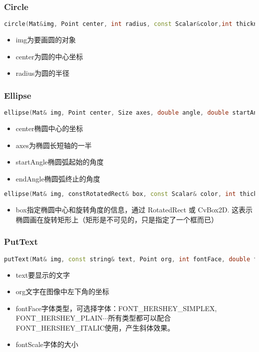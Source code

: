 \documentclass[12pt]{article}
\begin{document}
\subsubsection{Circle}
\begin{lstlisting}[language=c++]
circle(Mat&img, Point center, int radius, const Scalar&color,int thickness=1, int lineType=8, int shift=0)
\end{lstlisting}
	\begin{itemize}
	\item img为要画圆的对象
	\item center为圆的中心坐标
	\item radius为圆的半径
	\end{itemize}

\subsubsection{Ellipse}
\begin{lstlisting}[language=c++]
ellipse(Mat& img, Point center, Size axes, double angle, double startAngle, double endAngle, const Scalar& color, int thickness=1, int lineType=8, int shift=0)
\end{lstlisting}
	\begin{itemize}
	\item center椭圆中心的坐标
	\item axes为椭圆长短轴的一半
	\item startAngle椭圆弧起始的角度
	\item endAngle椭圆弧终止的角度
	\end{itemize}
\begin{lstlisting}[language=c++]
ellipse(Mat& img, constRotatedRect& box, const Scalar& color, int thickness=1, int lineType=8)
\end{lstlisting}
	\begin{itemize}
	\item box指定椭圆中心和旋转角度的信息，通过 RotatedRect 或 CvBox2D. 这表示椭圆画在旋转矩形上（矩形是不可见的，只是指定了一个框而已）
	\end{itemize}

\subsubsection{PutText}
\begin{lstlisting}[language=c++]
putText(Mat& img, const string& text, Point org, int fontFace, double fontScale, Scalar color, int thickness=1, int lineType=8, bool bottomLeftOrigin=false )
\end{lstlisting}
	\begin{itemize}
	\item text要显示的文字
	\item org文字在图像中左下角的坐标
	\item fontFace字体类型，可选择字体：FONT\_HERSHEY\_SIMPLEX, FONT\_HERSHEY\_PLAIN$\cdots$所有类型都可以配合 FONT\_HERSHEY\_ITALIC使用，产生斜体效果。
	\item fontScale字体的大小
	\end{itemize}
\end{document}
